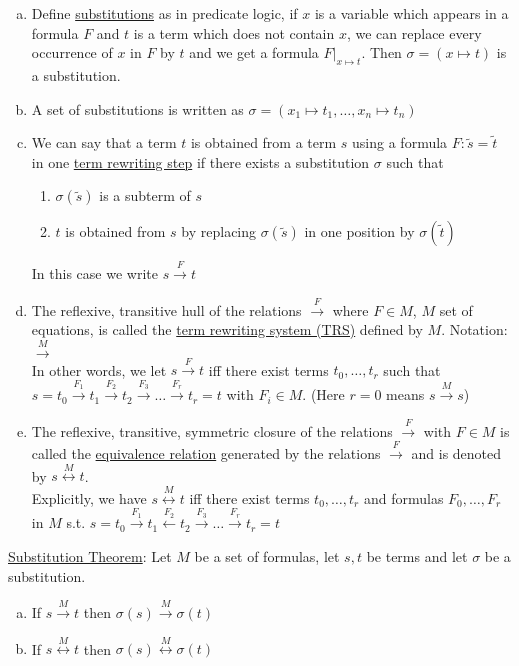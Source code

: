 \documentclass[a4paper]{article}
\newcommand{\ul}{\underline}
\begin{document}
\begin{enumerate}[(a)]
	\item Define \ul{substitutions} as in predicate logic, if $x$ is a variable which appears in a formula $F$ and $t$ is a term which does not contain $x$, we can replace every occurrence of $x$ in $F$ by $t$ and we get a formula $F\vert_{x\mapsto t}$. Then $\sigma=(x\mapsto t)$ is a substitution.
	\item A set of substitutions is written as $\sigma=(x_1\mapsto t_1,\dots,x_n\mapsto t_n)$
	\item We can say that a term $t$ is obtained from a term $s$ using a formula $F:\tilde s=\tilde t$ in one \ul{term rewriting step} if there exists a substitution $\sigma$ such that
	\begin{enumerate}[(1)]
		\item $\sigma(\tilde s)$ is a subterm of $s$
		\item $t$ is obtained from $s$ by replacing $\sigma(\tilde s)$ in one position by $\sigma(\tilde t)$
	\end{enumerate}
	In this case we write $s\overset{F}{\rightarrow} t$
	\item The reflexive, transitive hull of the relations $\overset{F}{\rightarrow}$ where $F\in M$, $M$ set of equations, is called the \ul{term rewriting system (TRS)} defined by $M$. Notation: $\overset{M}{\rightarrow}$\\
	In other words, we let $s\overset{F}{\rightarrow} t$ iff there exist terms $t_0,\dots,t_r$ such that $s=t_0\overset{F_1}{\rightarrow}t_1\overset{F_2}{\rightarrow}t_2\overset{F_3}{\rightarrow}\dots\overset{F_r}{\rightarrow}t_r=t$ with $F_i\in M$. (Here $r=0$ means $s\overset{M}{\rightarrow}s$)
	\item The reflexive, transitive, symmetric closure of the relations $\overset{F}{\rightarrow}$ with $F\in M$ is called the \ul{equivalence relation} generated by the relations $\overset{F}{\rightarrow}$ and is denoted by $s\overset{M}{\leftrightarrow} t$.\\
	Explicitly, we have $s\overset{M}{\leftrightarrow} t$ iff there exist terms $t_0,\dots,t_r$ and formulas $F_0,\dots,F_r$ in $M$ s.t. $s=t_0\overset{F_1}{\rightarrow}t_1\overset{F_2}{\leftarrow}t_2\overset{F_3}{\rightarrow}\dots\overset{F_r}{\rightarrow}t_r=t$
\end{enumerate}
\ul{Substitution Theorem}: Let $M$ be a set of formulas, let $s,t$ be terms and let $\sigma$ be a substitution.
\begin{enumerate}[(a)]
	\item If $s\overset{M}{\rightarrow}t$ then $\sigma(s)\overset{M}{\rightarrow}\sigma(t)$
	\item If $s\overset{M}{\leftrightarrow}t$ then $\sigma(s)\overset{M}{\leftrightarrow}\sigma(t)$
\end{enumerate}
\end{document}
